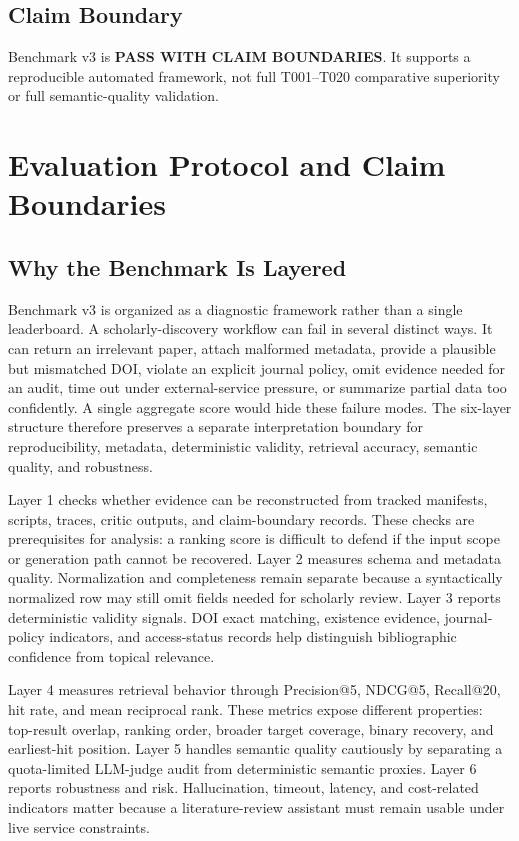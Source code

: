 \documentclass[10pt,twocolumn]{article}
\begin{document}
\subsection{Claim Boundary}
Benchmark v3 is \textbf{PASS WITH CLAIM BOUNDARIES}. It supports a reproducible automated framework, not full T001--T020 comparative superiority or full semantic-quality validation.

\section{Evaluation Protocol and Claim Boundaries}
\subsection{Why the Benchmark Is Layered}
Benchmark v3 is organized as a diagnostic framework rather than a single leaderboard. A scholarly-discovery workflow can fail in several distinct ways. It can return an irrelevant paper, attach malformed metadata, provide a plausible but mismatched DOI, violate an explicit journal policy, omit evidence needed for an audit, time out under external-service pressure, or summarize partial data too confidently. A single aggregate score would hide these failure modes. The six-layer structure therefore preserves a separate interpretation boundary for reproducibility, metadata, deterministic validity, retrieval accuracy, semantic quality, and robustness.

Layer 1 checks whether evidence can be reconstructed from tracked manifests, scripts, traces, critic outputs, and claim-boundary records. These checks are prerequisites for analysis: a ranking score is difficult to defend if the input scope or generation path cannot be recovered. Layer 2 measures schema and metadata quality. Normalization and completeness remain separate because a syntactically normalized row may still omit fields needed for scholarly review. Layer 3 reports deterministic validity signals. DOI exact matching, existence evidence, journal-policy indicators, and access-status records help distinguish bibliographic confidence from topical relevance.

Layer 4 measures retrieval behavior through Precision@5, NDCG@5, Recall@20, hit rate, and mean reciprocal rank. These metrics expose different properties: top-result overlap, ranking order, broader target coverage, binary recovery, and earliest-hit position. Layer 5 handles semantic quality cautiously by separating a quota-limited LLM-judge audit from deterministic semantic proxies. Layer 6 reports robustness and risk. Hallucination, timeout, latency, and cost-related indicators matter because a literature-review assistant must remain usable under live service constraints.
\end{document}
